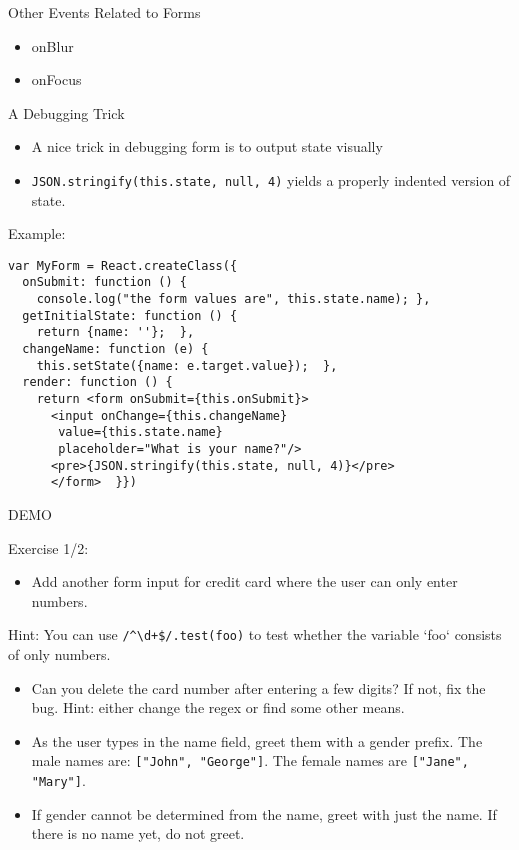\documentclass[presentation]{beamer}
\begin{document}
\begin{frame}[label={sec:orgheadline12}]{Other Events Related to Forms}
\begin{itemize}
\item onBlur
\item onFocus
\end{itemize}
\end{frame}

\begin{frame}[fragile,label={sec:orgheadline13}]{A Debugging Trick}
 \begin{itemize}
\item A nice trick in debugging form is to output state visually
\item \texttt{JSON.stringify(this.state, null, 4)} yields a properly indented version of
state.
\end{itemize}
\end{frame}

\begin{frame}[fragile,label={sec:orgheadline14}]{Example:}
 \begin{verbatim}
var MyForm = React.createClass({
  onSubmit: function () {
    console.log("the form values are", this.state.name); },
  getInitialState: function () {
    return {name: ''};  },
  changeName: function (e) {
    this.setState({name: e.target.value});  },
  render: function () {
    return <form onSubmit={this.onSubmit}>
      <input onChange={this.changeName}
       value={this.state.name}
       placeholder="What is your name?"/>
      <pre>{JSON.stringify(this.state, null, 4)}</pre>
      </form>  }})
\end{verbatim}


DEMO
\end{frame}

\begin{frame}[fragile,label={sec:orgheadline15}]{Exercise 1/2:}
 \begin{itemize}
\item Add another form input for credit card where the user can only enter numbers.
\end{itemize}

Hint: You can use \texttt{/\textasciicircum{}\textbackslash{}d+\$/.test(foo)} to test whether the variable `foo` consists of only numbers.

\begin{itemize}
\item Can you delete the card number after entering a few digits? If not, fix the
bug. Hint: either change the regex or find some other means.

\item As the user types in the name field, greet them with a gender prefix. The
male names are: \texttt{["John", "George"]}. The female names are \texttt{["Jane",
  "Mary"]}.

\item If gender cannot be determined from the name, greet with just the name. If
there is no name yet, do not greet.
\end{itemize}
\end{frame}
\end{document}
